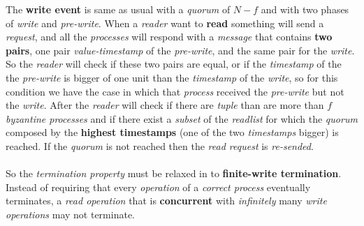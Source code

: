 \documentclass{article}
\begin{document}
The \textbf{write event} is same as usual with a \emph{quorum} of $N-f$ and with two phases of \emph{write} and \emph{pre-write}. When a \emph{reader} want to \textbf{read} something will send a \emph{request}, and all the \emph{processes} will respond with a \emph{message} that contains \textbf{two pairs}, one pair\emph{ value-timestamp} of the \emph{pre-write}, and the same pair for the \emph{write}. So the \emph{reader} will check if these two pairs are equal, or if the \emph{timestamp} of the the \emph{pre-write} is bigger of one unit than the \emph{timestamp} of the \emph{write}, so for this condition we have the case in which that \emph{process} received the \emph{pre-write} but not the \emph{write}. After the \emph{reader} will check if there are \emph{tuple} than are more than $f$ \emph{byzantine processes} and if there exist a \emph{subset} of the \emph{readlist} for which the \emph{quorum} composed by the \textbf{highest timestamps} (one of the two \emph{timestamps} bigger) is reached. If the \emph{quorum} is not reached then the \emph{read request} is \emph{re-sended}.\\\\
So the \emph{termination property} must be relaxed in to \textbf{finite-write termination}. Instead of requiring that every \emph{operation} of a\emph{ correct process} eventually terminates, a \emph{read operation} that is \textbf{concurrent} with \emph{infinitely} many \emph{write operations} may not terminate. 
\end{document}
